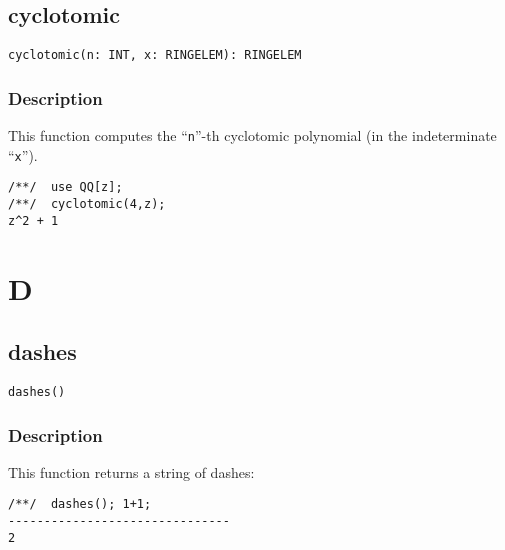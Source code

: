 \documentclass[a4paper]{mybook}
\newenvironment{command}{}{} %
\begin{document}
\section{cyclotomic}
\label{cyclotomic}
\begin{command} %


\begin{Verbatim}[label=syntax, rulecolor=\color{MidnightBlue},
frame=single]
cyclotomic(n: INT, x: RINGELEM): RINGELEM
\end{Verbatim}


\subsection*{Description}

This function computes the ``\verb&n&''-th cyclotomic polynomial (in the
indeterminate ``\verb&x&'').
\begin{Verbatim}[label=example, rulecolor=\color{PineGreen}, frame=single]
/**/  use QQ[z];
/**/  cyclotomic(4,z);
z^2 + 1
\end{Verbatim}


\end{command} %

\chapter{D}  %
\label{D}

\section{dashes}
\label{dashes}
\begin{command} %


\begin{Verbatim}[label=syntax, rulecolor=\color{MidnightBlue},
frame=single]
dashes()
\end{Verbatim}


\subsection*{Description}

This function returns a string of dashes:
\begin{Verbatim}[label=example, rulecolor=\color{PineGreen}, frame=single]
/**/  dashes(); 1+1;
-------------------------------
2
\end{Verbatim}


\end{command} %
\end{document}

